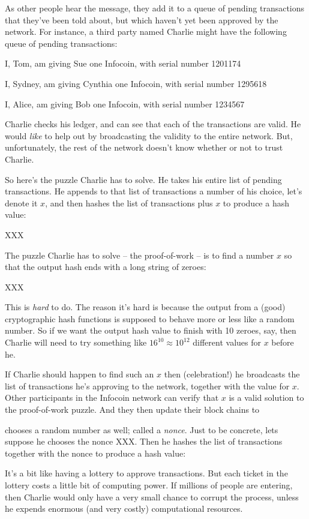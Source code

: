 \documentclass[12pt]{book}
\begin{document}
As other people hear the message, they add it to a queue of pending
transactions that they've been told about, but which haven't yet been
approved by the network.  For instance, a third party named Charlie
might have the following queue of pending transactions:

I, Tom, am giving Sue one Infocoin, with serial number 1201174

I, Sydney, am giving Cynthia one Infocoin, with serial number 1295618

I, Alice, am giving Bob one Infocoin, with serial number 1234567

Charlie checks his ledger, and can see that each of the transactions
are valid.  He would \emph{like} to help out by broadcasting the
validity to the entire network.  But, unfortunately, the rest of the
network doesn't know whether or not to trust Charlie.

So here's the puzzle Charlie has to solve.  He takes his entire list
of pending transactions.  He appends to that list of transactions a
number of his choice, let's denote it $x$, and then hashes the list of
transactions plus $x$ to produce a hash value:

XXX

The puzzle Charlie has to solve -- the proof-of-work -- is to find a
number $x$ so that the output hash ends with a long string of zeroes:

XXX

This is \emph{hard} to do.  The reason it's hard is because the output
from a (good) cryptographic hash functions is supposed to behave more
or less like a random number.  So if we want the output hash value to
finish with 10 zeroes, say, then Charlie will need to try something
like $16^{10} \approx 10^{12}$ different values for $x$ before he.

If Charlie should happen to find such an $x$ then (celebration!)  he
broadcasts the list of transactions he's approving to the network,
together with the value for $x$.  Other participants in the Infocoin
network can verify that $x$ is a valid solution to the proof-of-work
puzzle.  And they then update their block chains to 


chooses a random number as well; called
a \emph{nonce}.  Just to be concrete, lets suppose he chooses the
nonce XXX.  Then he hashes the list of transactions together with the
nonce to produce a hash value:


It's a bit like having a lottery to approve transactions.  But each
ticket in the lottery costs a little bit of computing power.  If
millions of people are entering, then Charlie would only have a very
small chance to corrupt the process, unless he expends enormous (and
very costly) computational resources.
\end{document}

